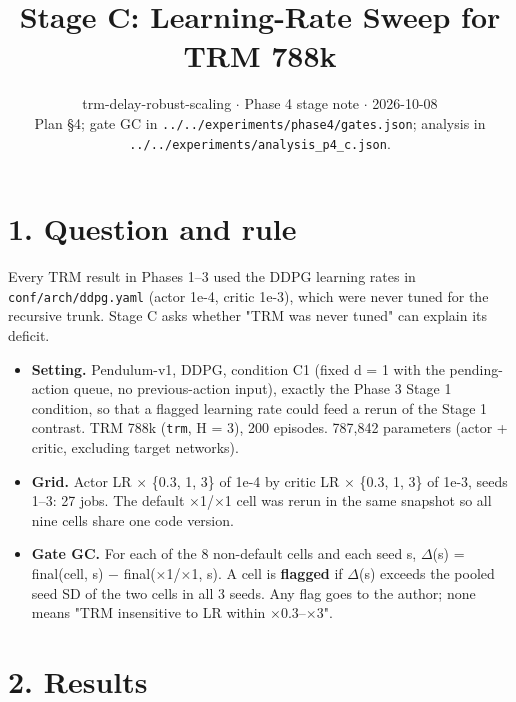 \documentclass[11pt]{article}
\title{Stage C: Learning-Rate Sweep for TRM 788k}
\author{}
\date{trm-delay-robust-scaling $\cdot$ Phase 4 stage note $\cdot$ 2026-10-08\\[2pt]Plan \S{}4; gate GC in \texttt{.\allowbreak{}.\allowbreak{}/\allowbreak{}.\allowbreak{}.\allowbreak{}/\allowbreak{}experiments/\allowbreak{}phase4/\allowbreak{}gates.\allowbreak{}json}; analysis in \texttt{.\allowbreak{}.\allowbreak{}/\allowbreak{}.\allowbreak{}.\allowbreak{}/\allowbreak{}experiments/\allowbreak{}analysis\_\allowbreak{}p4\_\allowbreak{}c.\allowbreak{}json}.}
\begin{document}
\maketitle
\section*{1. Question and rule}



Every TRM result in Phases 1--3 used the DDPG learning rates in \texttt{conf/\allowbreak{}arch/\allowbreak{}ddpg.\allowbreak{}yaml} (actor 1e-4, critic 1e-3), which were never tuned for the recursive trunk. Stage C asks whether "TRM was never tuned" can explain its deficit.



\begin{itemize}
\item \textbf{Setting.} Pendulum-v1, DDPG, condition C1 (fixed d = 1 with the pending-action queue, no previous-action input), exactly the Phase 3 Stage 1 condition, so that a flagged learning rate could feed a rerun of the Stage 1 contrast. TRM 788k (\texttt{trm}, H = 3), 200 episodes. 787,842 parameters (actor + critic, excluding target networks).
\item \textbf{Grid.} Actor LR $\times$ \{0.3, 1, 3\} of 1e-4 by critic LR $\times$ \{0.3, 1, 3\} of 1e-3, seeds 1--3: 27 jobs. The default $\times$1/$\times$1 cell was rerun in the same snapshot so all nine cells share one code version.
\item \textbf{Gate GC.} For each of the 8 non-default cells and each seed s, $\Delta$(s) = final(cell, s) $-$ final($\times$1/$\times$1, s). A cell is \textbf{flagged} if $\Delta$(s) exceeds the pooled seed SD of the two cells in all 3 seeds. Any flag goes to the author; none means "TRM insensitive to LR within $\times$0.3--$\times$3".
\end{itemize}



\section*{2. Results}
\end{document}
